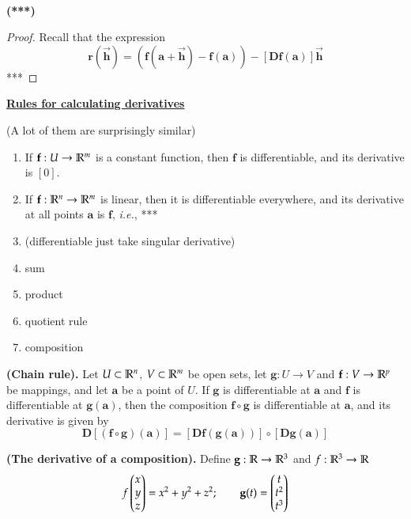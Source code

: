 \\

\begin{proposition}
\textbf{(***)}
\end{proposition}

\begin{proof}
  Recall that the expression
  \[\bm{r}(\vec{\bm{h}})=\left(\bm{f}(\bm{a}+\vec{\bm{h}})-\bm{f}(\bm{a})\right)-[\bm{Df}(\bm{a})]\vec{\bm{h}}\]
  ***
\end{proof}

\ul{\textbf{Rules for calculating derivatives}}

(A lot of them are surprisingly similar)
\begin{enumerate}[1.]
  \item If $\textbf{f} : U \to \mathbb{R}^m$ is a constant function, then $\bm{f}$ is differentiable, and its derivative is $[0]$.
  \item If $\textbf{f} : \mathbb{R}^n \to \mathbb{R}^m$ is linear, then it is differentiable everywhere, and its derivative at all points $\bm{a}$ is $\bm{f}$, \textit{i.e.}, ***
  \item (differentiable just take singular derivative)
  \item sum
  \item product
  \item quotient rule
  \item composition
\end{enumerate}

\begin{theorem}
  \textbf{(Chain rule).} Let $U\subset \mathbb{R}^n$, $V\subset \mathbb{R}^m$ be open sets, let $\bm{g} : U \to V$ and $\textbf{f} : V \to \mathbb{R}^p$ be mappings, and let $\bm{a}$ be a point of $U$. If $\bm{g}$ is differentiable at $\bm{a}$ and $\bm{f}$ is differentiable at $\bm{g}(\bm{a})$, then the composition $\bm{f} \circ \bm{g}$ is differentiable at $\bm{a}$, and its derivative is given by
  \[\bm{D}[(\bm{f}\circ \bm{g})(\bm{a})]=[\bm{Df} (\bm{g}(\bm{a}))]\circ [\bm{Dg}(\bm{a})]\]
\end{theorem}

\example
\textbf{(The derivative of a composition).} Define $\textbf{g} : \mathbb{R} \to \mathbb{R}^3$ and $f : \mathbb{R}^3 \to \mathbb{R}$
\[f\begin{pmatrix} x \\ y \\ z \end{pmatrix}=x^2+y^2+z^2;\qquad \textbf{g}(t)=\begin{pmatrix} t \\ t^2 \\ t^3 \end{pmatrix}\]
